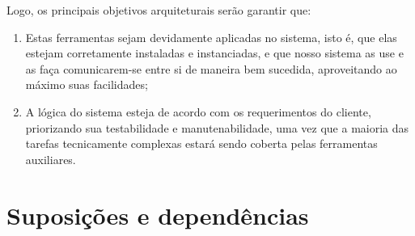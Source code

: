 \documentclass[11pt, a4paper]{article}
\begin{document}
        Logo, os principais objetivos arquiteturais serão garantir que:

        \begin{enumerate}
            \item Estas ferramentas sejam devidamente aplicadas no sistema, isto é, que elas estejam corretamente instaladas e instanciadas,
            e que nosso sistema as use e as faça comunicarem-se entre si de
            maneira bem sucedida, aproveitando ao máximo suas facilidades;

            \item A lógica do sistema esteja de acordo com os requerimentos do
            cliente, priorizando sua testabilidade e manutenabilidade, uma
            vez que a maioria das tarefas tecnicamente complexas estará sendo coberta
            pelas ferramentas auxiliares.
        \end{enumerate}

    \section{Suposições e dependências}
\end{document}
